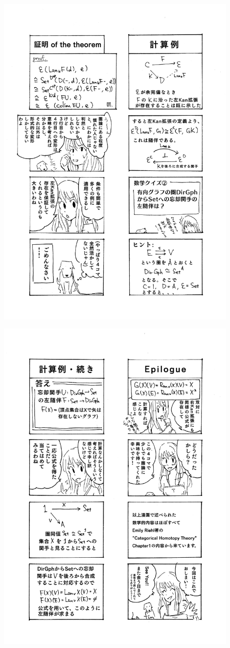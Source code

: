 \clearpage
{}
\begin{center}
\includegraphics[width=0.9\textwidth]{kbkn5.png}
\end{center}
\begin{center}
\includegraphics[width=0.9\textwidth]{kbkn6.png}
\end{center}
